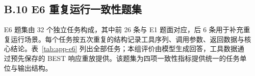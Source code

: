 \documentclass{dcfp}
\begin{document}
\endgroup







\par\smallskip

\subsection*{B.10  E6 重复运行一致性题集}

E6 题集由 32 个独立任务构成，其中前 26 条与 E1 题面对应，后 6 条用于补充重复运行场景。每个任务按五次重复的结构记录工具序列、调用参数、返回数据与核心结论。表~\ref{tab:app-e6} 列出全部任务；本组评价由模型生成回答，工具数据通过预先保存的 BEST 响应重放提供。该题集为四项一致性指标提供统一的任务单位与输出结构。

\par\begingroup
\fontsize{8.6bp}{11bp}\selectfont
\end{document}
